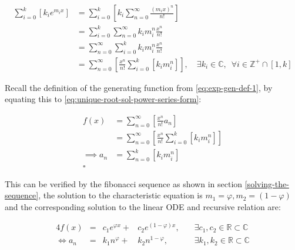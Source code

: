 \documentclass[a4paper,11pt,twoside]{article}
\begin{document}
\begin{enumerate}
\begin{align}
    \sum^{k}_{i= 0}   {\left[{ k_i e^{m_i x}  }\right]}  &= \sum^{k}_{i= 0}   {\left[{ k_i \sum^{\infty}_{n= 0}   \frac{{\left({ m_i x }\right)}^n}{n!}  }\right]}  \nonumber \\
							 &= \sum^{k}_{i= 0}  \sum^{\infty}_{n= 0}   k_i m_i^n \frac{x^n}{n!} \nonumber\\
							 &=    \sum^{\infty}_{n= 0} \sum^{k}_{i= 0}   k_i m_i^n \frac{x^n}{n!} \nonumber \\
							 &= \sum^{\infty}_{n= 0} {\left[{ \frac{x^n}{n!}  \sum^{k}_{i=0}   {\left[{ k_im^n_i }\right]}  }\right]}, \quad \exists k_i \in \mathbb{C}, \enspace \forall i \in \mathbb{Z}^+\cap {\left[{ 1, k }\right]}     \label{eq:unique-root-sol-power-series-form}
\end{align}


Recall the definition of the generating function from \eqref{eq:exp-gen-def-1}, by equating this to \eqref{eq:unique-root-sol-power-series-form}:

\begin{align}
    f{\left({ x }\right)} &= \sum^{\infty}_{n= 0}   {\left[{  \frac{x^n}{n!} a_n }\right]} \nonumber \\
&= \sum^{\infty}_{n= 0} {\left[{ \frac{x^n}{n!}  \sum^{k}_{i=0}   {\left[{ k_im^n_i }\right]}  }\right]}  \nonumber \\
      \implies  a_n &= \sum^{k}_{n= 0} {\left[{ k_im_i^n }\right]}     \nonumber \\ \nonumber
\square
\end{align}

This can be verified by the fibonacci sequence as shown in section \ref{solving-the-sequence}, the solution to the characteristic equation is \(m_1 = \varphi, m_2 = {\left({ 1-\varphi }\right)}\) and the corresponding solution to the linear ODE and recursive relation are:

\begin{alignat}{4}
    f{\left({ x }\right)} &= &c_1 e^{\varphi x} +  &c_2 e^{{\left({ 1-\varphi }\right)} x}, \quad &\exists c_1, c_2 \in \mathbb{R} \subset \mathbb{C} \nonumber \\
    \iff  a_n &= &k_1 n^{\varphi} +  &k_2 n^{1- \varphi}, &\exists k_1, k_2 \in \mathbb{R} \subset \mathbb{C} \nonumber
\end{alignat}
\end{enumerate}
\end{document}
